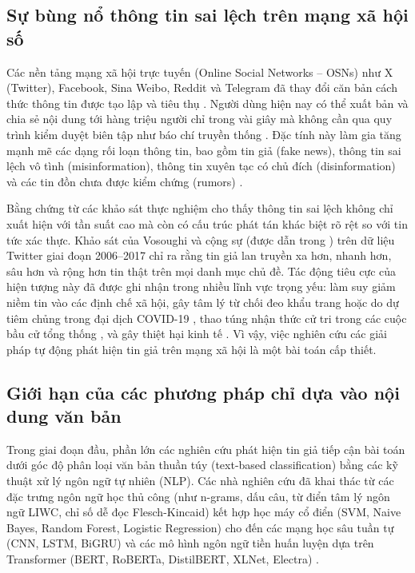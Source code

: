 \documentclass[11pt,a4paper]{extreport}
\begin{document}
\subsection{Sự bùng nổ thông tin sai lệch trên mạng xã hội số}
Các nền tảng mạng xã hội trực tuyến (Online Social Networks -- OSNs) như X (Twitter), Facebook, Sina Weibo, Reddit và Telegram đã thay đổi căn bản cách thức thông tin được tạo lập và tiêu thụ \cite{noauthor_real-time_2024, noauthor_msdsi-fnd_2025, noauthor_unlp_2025}. Người dùng hiện nay có thể xuất bản và chia sẻ nội dung tới hàng triệu người chỉ trong vài giây mà không cần qua quy trình kiểm duyệt biên tập như báo chí truyền thống \cite{noauthor_dual_2025}. Đặc tính này làm gia tăng mạnh mẽ các dạng rối loạn thông tin, bao gồm tin giả (fake news), thông tin sai lệch vô tình (misinformation), thông tin xuyên tạc có chủ đích (disinformation) và các tin đồn chưa được kiểm chứng (rumors) \cite{noauthor_disinformation_2024, noauthor_comparative_2024}.

Bằng chứng từ các khảo sát thực nghiệm cho thấy thông tin sai lệch không chỉ xuất hiện với tần suất cao mà còn có cấu trúc phát tán khác biệt rõ rệt so với tin tức xác thực. Khảo sát của Vosoughi và cộng sự (được dẫn trong \cite{noauthor_early_2025, noauthor_integrating_2025}) trên dữ liệu Twitter giai đoạn 2006--2017 chỉ ra rằng tin giả lan truyền xa hơn, nhanh hơn, sâu hơn và rộng hơn tin thật trên mọi danh mục chủ đề. Tác động tiêu cực của hiện tượng này đã được ghi nhận trong nhiều lĩnh vực trọng yếu: làm suy giảm niềm tin vào các định chế xã hội, gây tâm lý từ chối đeo khẩu trang hoặc do dự tiêm chủng trong đại dịch COVID-19 \cite{zhang_rumor_2024, noauthor_semantic_2025}, thao túng nhận thức cử tri trong các cuộc bầu cử tổng thống \cite{noauthor_dual_2025, noauthor_heterogeneous_2025}, và gây thiệt hại kinh tế \cite{noauthor_exploiting_2024}. Vì vậy, việc nghiên cứu các giải pháp tự động phát hiện tin giả trên mạng xã hội là một bài toán cấp thiết.

\subsection{Giới hạn của các phương pháp chỉ dựa vào nội dung văn bản}
Trong giai đoạn đầu, phần lớn các nghiên cứu phát hiện tin giả tiếp cận bài toán dưới góc độ phân loại văn bản thuần túy (text-based classification) bằng các kỹ thuật xử lý ngôn ngữ tự nhiên (NLP). Các nhà nghiên cứu đã khai thác từ các đặc trưng ngôn ngữ học thủ công (như n-grams, dấu câu, từ điển tâm lý ngôn ngữ LIWC, chỉ số dễ đọc Flesch-Kincaid) kết hợp học máy cổ điển (SVM, Naive Bayes, Random Forest, Logistic Regression) \cite{noauthor_hybrid_2025, noauthor_misinformation_2025} cho đến các mạng học sâu tuần tự (CNN, LSTM, BiGRU) và các mô hình ngôn ngữ tiền huấn luyện dựa trên Transformer (BERT, RoBERTa, DistilBERT, XLNet, Electra) \cite{noauthor_comparative_2024, noauthor_dual_2025, noauthor_fake_2025}.
\end{document}
